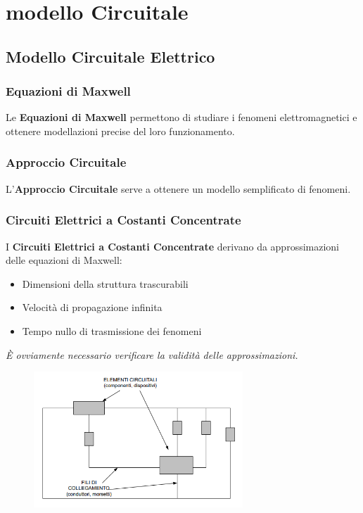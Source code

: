 \chapter{modello Circuitale}
\section{Modello Circuitale Elettrico}

\subsection*{Equazioni di Maxwell}
Le \textbf{Equazioni di Maxwell} permettono di studiare i fenomeni elettromagnetici e ottenere modellazioni precise del loro funzionamento.

\subsection*{Approccio Circuitale}
L'\textbf{Approccio Circuitale} serve a ottenere un modello semplificato di fenomeni.

\subsection*{Circuiti Elettrici a Costanti Concentrate}
I \textbf{Circuiti Elettrici a Costanti Concentrate} derivano da approssimazioni delle equazioni di Maxwell:

\begin{itemize}
    \item Dimensioni della struttura trascurabili
    \item Velocità di propagazione infinita
    \item Tempo nullo di trasmissione dei fenomeni
\end{itemize}

\textit{È ovviamente necessario verificare la validità delle approssimazioni.}

\begin{figure}[H]
    \centering
    \includegraphics[width=0.7\textwidth]{capitoli/capitolo2/immagini/image1.png}
\end{figure}

